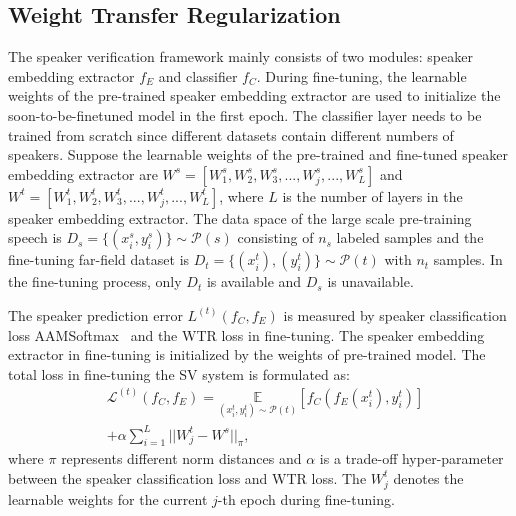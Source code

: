 \documentclass{article}
\begin{document}
\subsection{Weight Transfer Regularization}
The speaker verification framework mainly consists of two modules: speaker embedding extractor $f_E$ and classifier $f_C$. During fine-tuning, the learnable weights of the pre-trained speaker embedding extractor are used to initialize the soon-to-be-finetuned model in the first epoch. The classifier layer needs to be trained from scratch since different datasets contain different numbers of speakers. Suppose the learnable weights of the pre-trained and fine-tuned speaker embedding extractor are $W^s=[W_1^s, W_2^s, W_3^s, ..., W_j^s, ... , W_L^s]$ and $W^t=[W_1^t, W_2^t, W_3^t, ..., W_j^t, ... , W_L^t]$, where $L$ is the number of layers in the speaker embedding extractor. The data space of the large scale pre-training speech is $D_s=\{(x{^s_i},y{^s_i})\} \sim \mathcal{P}(s)$ consisting of $n_s$ labeled samples and the fine-tuning far-field dataset is $D_t=\{(x{^t_i}),(y{^t_i})\} \sim \mathcal{P}(t)$ with $n_t$ samples. In the fine-tuning process, only $D_t$ is available and $D_s$ is unavailable. 

The speaker prediction error ${L}^{(t)}\left(f_C,f_E\right)$ %
is measured by speaker classification loss AAMSoftmax~\cite{deng2019arcface} and the WTR loss in fine-tuning. The speaker embedding extractor in fine-tuning is initialized by the weights of pre-trained model. %
The total loss in fine-tuning the SV system is formulated as: 
\begin{equation} 
\begin{aligned}
 & \mathcal{L}^{(t)}\left(f_C,f_E\right)= \underset{(x_i^t, y_i^t) \sim \mathcal{P}(t)}{\mathbb{E}}\left[f_C\left(f_E(x_i^t), y_i^t\right)\right] \\
  &  + \alpha  \sum_{i=1}^{L} ||W_j^t - W^s ||_\pi, 
\end{aligned}
\label{feq1}
\end{equation}
where $\pi$ represents different norm distances and $\alpha$ is a trade-off hyper-parameter between the speaker classification loss and WTR loss. The $W^t_j$ denotes the learnable weights for the current $j$-th epoch during fine-tuning.
\iffalse
Suppose the data space of large-scale pre-training and small-scale fine-tuning datasets are $D_s=\{(x{^s_i})\}$ consisting of $n_s$ labeled samples
and $D_t = \{(x^t_i)\}$ with the distribution of . 
\fi 
\end{document}
